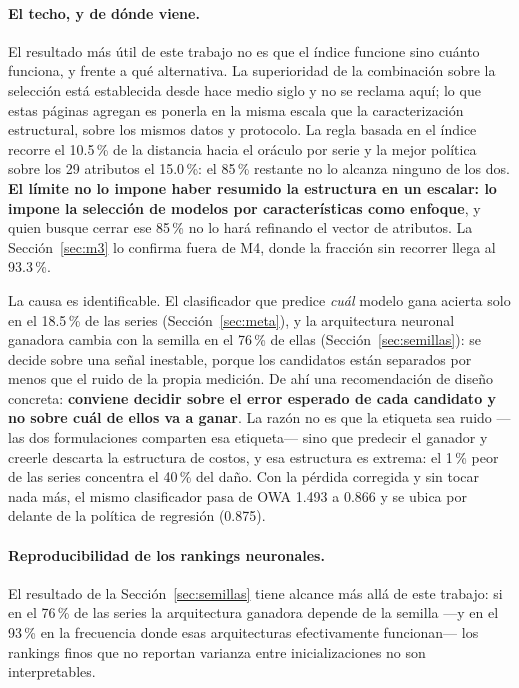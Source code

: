 \paragraph{El techo, y de dónde viene.} El resultado más útil de este trabajo no es que el
índice funcione sino cuánto funciona, y frente a qué alternativa. La superioridad de la
combinación sobre la selección está establecida desde hace medio siglo
\cite{bates1969,wang2023} y no se reclama aquí; lo que estas páginas agregan es ponerla en
la misma escala que la caracterización estructural, sobre los mismos datos y protocolo. La
regla basada en el índice recorre el 10.5\,\% de la distancia hacia el oráculo por serie y
la mejor política sobre los 29 atributos el 15.0\,\%: el 85\,\% restante no lo alcanza
ninguno de los dos. \textbf{El límite no lo impone haber resumido la estructura en un
escalar: lo impone la selección de modelos por características como enfoque}, y quien
busque cerrar ese 85\,\% no lo hará refinando el vector de atributos. La
Sección~\ref{sec:m3} lo confirma fuera de M4, donde la fracción sin recorrer llega al
93.3\,\%.

La causa es identificable. El clasificador que predice \emph{cuál} modelo gana acierta
solo en el 18.5\,\% de las series (Sección~\ref{sec:meta}), y la arquitectura neuronal
ganadora cambia con la semilla en el 76\,\% de ellas (Sección~\ref{sec:semillas}): se
decide sobre una señal inestable, porque los candidatos están separados por menos que el
ruido de la propia medición. De ahí una recomendación de
diseño concreta: \textbf{conviene decidir sobre el error esperado de cada candidato y no
sobre cuál de ellos va a ganar}. La razón no es que la etiqueta sea ruido ---las dos
formulaciones comparten esa etiqueta--- sino que predecir el ganador y creerle descarta la
estructura de costos, y esa estructura es extrema: el 1\,\% peor de las series concentra
el 40\,\% del daño. Con la pérdida corregida y sin tocar nada más, el mismo clasificador
pasa de OWA 1.493 a 0.866 y se ubica por delante de la política de regresión (0.875).

\paragraph{Reproducibilidad de los rankings neuronales.} El resultado de la
Sección~\ref{sec:semillas} tiene alcance más allá de este trabajo: si en el 76\,\% de las
series la arquitectura ganadora depende de la semilla ---y en el 93\,\% en la frecuencia
donde esas arquitecturas efectivamente funcionan--- los rankings finos que no reportan
varianza entre inicializaciones no son interpretables.

